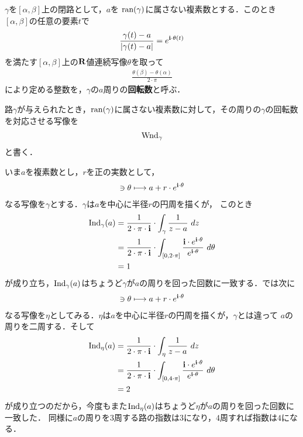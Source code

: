 	\begin{screen}
		\begin{dfn}[回転数]
			$\gamma$を$[\alpha,\beta]$上の閉路として，$a$を
			$\operatorname*{ran} (\gamma)$に属さない複素数とする．このとき$[\alpha,\beta]$の任意の要素$t$で
			\begin{align}
				\frac{\gamma(t) - a}{|\gamma(t) - a|} = e^{\mathbf{i}\cdot\theta(t)}
			\end{align}
			を満たす$[\alpha,\beta]$上の$\mathbf{R}$値連続写像$\theta$を取って
			\begin{align}
				\frac{\theta(\beta) - \theta(\alpha)}{2\cdot\pi}
			\end{align}
			により定める整数を，$\gamma$の$a$周りの{\bf 回転数}と呼ぶ．
		\end{dfn}
	\end{screen}
	
	路$\gamma$が与えられたとき，$\operatorname*{ran} (\gamma)$に属さない複素数に対して，その周りの$\gamma$の回転数を対応させる写像を
	\begin{align}
		\operatorname{Wnd}_{\gamma}
	\end{align}
	と書く．
	
	いま$a$を複素数とし，$r$を正の実数として，
	\begin{align}
		[0,2 \cdot \pi] \ni \theta \longmapsto a + r \cdot e^{\isym \cdot \theta}
	\end{align}
	なる写像を$\gamma$とする．$\gamma$は$a$を中心に半径$r$の円周を描くが，
	このとき
	\begin{align}
		\Ind_{\gamma}(a) 
		&= \frac{1}{2\cdot\pi\cdot\isym} \cdot \int_{\gamma} \frac{1}{z-a}\ dz \\
		&= \frac{1}{2\cdot\pi\cdot\isym} \cdot \int_{[0,2\cdot\pi]} \frac{\isym \cdot e^{\isym \cdot \theta}}{e^{\isym \cdot \theta}}\ d\theta \\
		&= 1
	\end{align}
	が成り立ち，$\operatorname{Ind}_{\gamma}(a)$はちょうど$\gamma$が$a$の周りを回った回数に一致する．では次に
	\begin{align}
		[0,4 \cdot \pi] \ni \theta \longmapsto a + r \cdot e^{\isym \cdot \theta}
	\end{align}
	なる写像を$\eta$としてみる．$\eta$は$a$を中心に半径$r$の円周を描くが，$\gamma$とは違って
	$a$の周りを二周する．そして
	\begin{align}
		\Ind_{\eta}(a) 
		&= \frac{1}{2\cdot\pi\cdot\isym} \cdot \int_{\eta} \frac{1}{z-a}\ dz \\
		&= \frac{1}{2\cdot\pi\cdot\isym} \cdot \int_{[0,4\cdot\pi]} \frac{\isym \cdot e^{\isym \cdot \theta}}{e^{\isym \cdot \theta}}\ d\theta \\
		&= 2
	\end{align}
	が成り立つのだから，今度もまた$\operatorname{Ind}_{\eta}(a)$はちょうど$\eta$が$a$の周りを回った回数に一致した．
	同様に$a$の周りを$3$周する路の指数は$3$になり，$4$周すれば指数は$4$になる．
	
